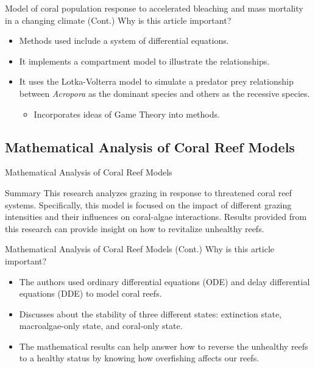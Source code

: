 \documentclass{beamer}
\begin{document}
\begin{frame}{Model of coral population response to accelerated bleaching and mass
mortality in a changing climate (Cont.)}
    Why is this article important?
    \begin{itemize}
        \item Methods used include a system of differential equations.
        \item It implements a compartment model to illustrate the relationships.
        \item It uses the Lotka-Volterra model to simulate a predator prey relationship between \textit{Acropora} as the dominant species and others as the recessive species.
        \begin{itemize}
            \item Incorporates ideas of Game Theory into methods.
        \end{itemize}
    \end{itemize}
\end{frame}

\subsection{Mathematical Analysis of Coral Reef Models}
\begin{frame}{Mathematical Analysis of Coral Reef Models}
    \begin{block}{Summary}
        This research analyzes grazing in response to threatened coral reef systems. Specifically, this model is focused on the impact of different grazing intensities and their influences on coral-algae interactions. Results provided from this research can provide insight on how to revitalize unhealthy reefs.
    \end{block}
\end{frame}

\begin{frame}{Mathematical Analysis of Coral Reef Models (Cont.)}
    Why is this article important?
    \begin{itemize}
        \item The authors used ordinary differential equations (ODE) and delay differential equations (DDE) to model coral reefs.
        \item Discusses about the stability of three different states: extinction state, macroalgae-only state, and coral-only state.
        \item  The mathematical results can help answer how to reverse the unhealthy reefs to a healthy status by knowing how overfishing affects our reefs.
    \end{itemize}
\end{frame}
\end{document}

